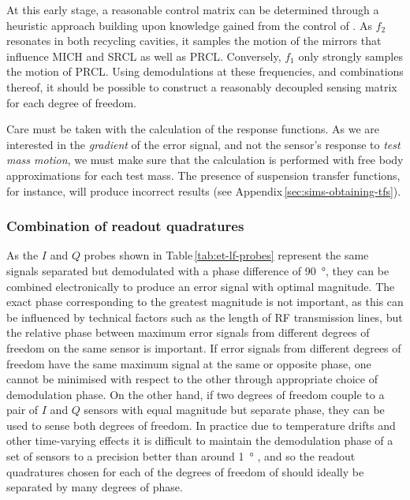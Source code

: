 At this early stage, a reasonable control matrix can be determined through a heuristic approach building upon knowledge gained from the control of \ALIGO{}. As $f_2$ resonates in both recycling cavities, it samples the motion of the mirrors that influence \gls{MICH} and \gls{SRCL} as well as \gls{PRCL}. Conversely, $f_1$ only strongly samples the motion of \gls{PRCL}. Using demodulations at these frequencies, and combinations thereof, it should be possible to construct a reasonably decoupled sensing matrix for each degree of freedom.

Care must be taken with the calculation of the response functions. As we are interested in the \emph{gradient} of the error signal, and not the sensor's response to \emph{test mass motion}, we must make sure that the calculation is performed with free body approximations for each test mass. The presence of suspension transfer functions, for instance, will produce incorrect results (see Appendix\,\ref{sec:sims-obtaining-tfs}).

\subsubsection{Combination of readout quadratures}
As the $I$ and $Q$ probes shown in Table\,\ref{tab:et-lf-probes} represent the same signals separated but demodulated with a phase difference of \SI{90}{\degree}, they can be combined electronically to produce an error signal with optimal magnitude. The exact phase corresponding to the greatest magnitude is not important, as this can be influenced by technical factors such as the length of \gls{RF} transmission lines, but the relative phase between maximum error signals from different degrees of freedom on the same sensor is important. If error signals from different degrees of freedom have the same maximum signal at the same or opposite phase, one cannot be minimised with respect to the other through appropriate choice of demodulation phase. On the other hand, if two degrees of freedom couple to a pair of $I$ and $Q$ sensors with equal magnitude but separate phase, they can be used to sense both degrees of freedom. In practice due to temperature drifts and other time-varying effects it is difficult to maintain the demodulation phase of a set of sensors to a precision better than around \SI{1}{\degree} \cite{Effler2014}, and so the readout quadratures chosen for each of the degrees of freedom of \ETLF{} should ideally be separated by many degrees of phase.

